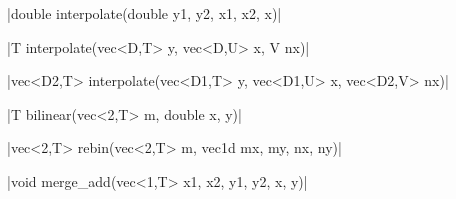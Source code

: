 \funcitem \cppinline|double interpolate(double y1, y2, x1, x2, x)| 

\cppinline|T interpolate(vec<D,T> y, vec<D,U> x, V nx)|

\cppinline|vec<D2,T> interpolate(vec<D1,T> y, vec<D1,U> x, vec<D2,V> nx)|

\funcitem \cppinline|T bilinear(vec<2,T> m, double x, y)| 

\funcitem \cppinline|vec<2,T> rebin(vec<2,T> m, vec1d mx, my, nx, ny)| 

\funcitem \cppinline|void merge_add(vec<1,T> x1, x2, y1, y2, x, y)| 
